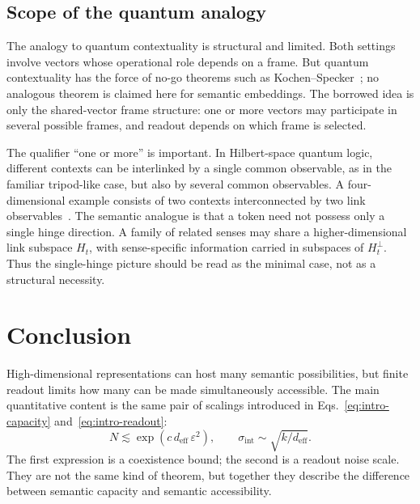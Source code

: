 \documentclass[
  aps,
  reprint,
  superscriptaddress,
  floatfix,
  nofootinbib,
  longbibliography
]{revtex4-2}
\newcommand{\deff}{d_{\mathrm{eff}}}
\newcommand{\sint}{\sigma_{\mathrm{int}}}
\begin{document}
\subsection{Scope of the quantum analogy}
\label{sec:quantum}

The analogy to quantum contextuality is structural and limited. Both
settings involve vectors whose operational role depends on a frame.
But quantum contextuality has the force of no-go theorems such as
Kochen--Specker~\cite{specker-60,kochen1}; no analogous theorem is
claimed here for semantic embeddings. The borrowed idea is only the
shared-vector frame structure: one or more vectors may participate in
several possible frames, and readout depends on which frame is selected.

The qualifier ``one or more'' is important. In Hilbert-space quantum
logic, different contexts can be interlinked by a single common
observable, as in the familiar tripod-like case, but also by several
common observables. A four-dimensional example consists of two contexts
interconnected by two link observables~\cite{svozil:040102}.
The semantic analogue is that a token need not possess only a single
hinge direction. A family of related senses may share a
higher-dimensional link subspace $H_t$, with sense-specific information
carried in subspaces of $H_t^\perp$. Thus the single-hinge picture
should be read as the minimal case, not as a structural necessity.

\section{Conclusion}
\label{sec:conclusion}

High-dimensional representations can host many semantic possibilities,
but finite readout limits how many can be made simultaneously
accessible. The main quantitative content is the same pair of scalings
introduced in Eqs.~\eqref{eq:intro-capacity} and~\eqref{eq:intro-readout}:
%
\begin{equation}
\label{eq:summary}
N\lesssim\exp(c\,\deff\,\varepsilon^{2}),
\qquad
\sint\sim\sqrt{k/\deff}.
\end{equation}
%
The first expression is a coexistence bound; the second is a readout
noise scale. They are not the same kind of theorem, but together they
describe the difference between semantic capacity and semantic
accessibility.
\end{document}

